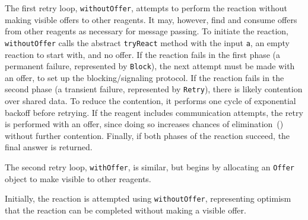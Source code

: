 \documentclass[preprint,nocopyrightspace]{sigplanconf}
\begin{document}
The first retry loop, \lstinline{withoutOffer}, attempts to perform the
reaction without making visible offers to other reagents.  It may, however,
find and consume offers from other reagents as necessary for message passing.
To initiate the reaction, \lstinline{withoutOffer} calls the abstract
\lstinline{tryReact} method with the input \lstinline{a}, an empty reaction to
start with, and no offer.  If the reaction fails in the first phase (a
permanent failure, represented by \lstinline{Block}), the next attempt must be
made with an offer, to set up the blocking/signaling protocol.  If the
reaction fails in the second phase (a transient failure, represented by
\lstinline{Retry}), there is likely contention over shared data.  To reduce
the contention, it performs one cycle of exponential backoff before retrying.
If the reagent includes communication attempts, the retry is performed with an
offer, since doing so increases chances of elimination~()
without further contention.  Finally, if both phases of the reaction succeed,
the final answer is returned.

The second retry loop, \lstinline{withOffer}, is similar, but begins by
allocating an \lstinline{Offer} object to make visible to other reagents.

Initially, the reaction is attempted using \lstinline{withoutOffer},
representing optimism that the reaction can be completed without making a
visible offer.
\end{document}
